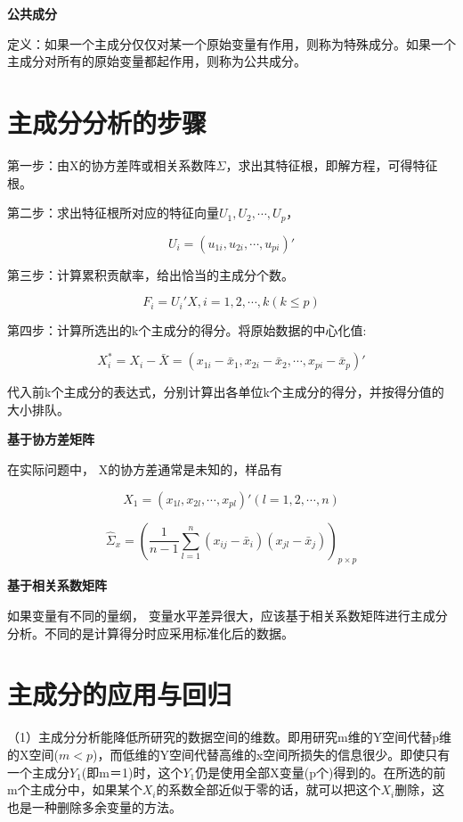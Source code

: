 \documentclass[]{ctexbook}
\begin{document}
\textbf{公共成分}

定义：如果一个主成分仅仅对某一个原始变量有作用，则称为特殊成分。如果一个主成分对所有的原始变量都起作用，则称为公共成分。

\hypertarget{ux4e3bux6210ux5206ux5206ux6790ux7684ux6b65ux9aa4}{%
\section{主成分分析的步骤}\label{ux4e3bux6210ux5206ux5206ux6790ux7684ux6b65ux9aa4}}

第一步：由X的协方差阵或相关系数阵\(\Sigma\)，求出其特征根，即解方程，可得特征根。

第二步：求出特征根所对应的特征向量\(U_1,U_2,\cdots,U_p\)，

\[U_i=(u_{1i},u_{2i},\cdots,u_{pi})'\]

第三步：计算累积贡献率，给出恰当的主成分个数。

\[F_i=U_i'X,i=1,2,\cdots,k(k\le p)\]

第四步：计算所选出的k个主成分的得分。将原始数据的中心化值:

\[X_i^*=X_i-\bar X=(x_{1i}-\bar x_1,x_{2i}-\bar x_2,\cdots,x_{pi}-\bar x_p)'\]

代入前k个主成分的表达式，分别计算出各单位k个主成分的得分，并按得分值的大小排队。

\textbf{基于协方差矩阵}

在实际问题中， X的协方差通常是未知的，样品有

\[X_1=(x_{1l},x_{2l},\cdots,x_{pl})'(l=1,2,\cdots,n)\]

\[\hat \Sigma_x=(\frac{1}{n-1}\sum_{l=1}^n(x_{ij}-\bar x_i)(x_{jl}-\bar x_j))_{p\times p}\]

\textbf{基于相关系数矩阵}

如果变量有不同的量纲， 变量水平差异很大，应该基于相关系数矩阵进行主成分分析。不同的是计算得分时应采用标准化后的数据。

\hypertarget{ux4e3bux6210ux5206ux7684ux5e94ux7528ux4e0eux56deux5f52}{%
\section{主成分的应用与回归}\label{ux4e3bux6210ux5206ux7684ux5e94ux7528ux4e0eux56deux5f52}}

（1）主成分分析能降低所研究的数据空间的维数。即用研究m维的Y空间代替p维的X空间(\(m<p\))，而低维的Y空间代替高维的x空间所损失的信息很少。即使只有一个主成分\(Y_1\)(即m＝1)时，这个\(Y_1\)仍是使用全部X变量(p个)得到的。在所选的前m个主成分中，如果某个\(X_i\)的系数全部近似于零的话，就可以把这个\(X_i\)删除，这也是一种删除多余变量的方法。
\end{document}
